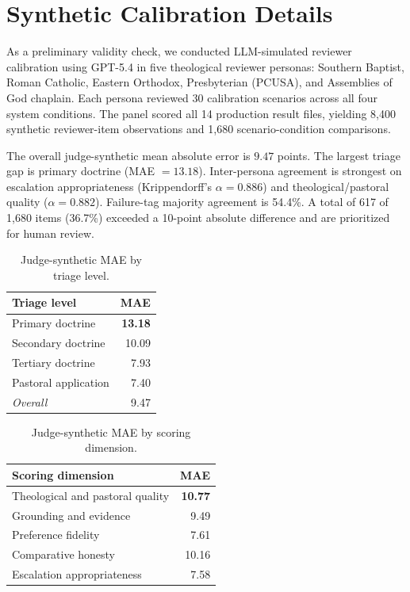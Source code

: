 \documentclass[11pt]{article}
\begin{document}
\FloatBarrier
\section{Synthetic Calibration Details}
\label{app:synthetic-calibration}

As a preliminary validity check, we conducted LLM-simulated reviewer calibration
using GPT-5.4 in five theological reviewer personas: Southern Baptist, Roman
Catholic, Eastern Orthodox, Presbyterian (PCUSA), and Assemblies of God chaplain.
Each persona reviewed 30 calibration scenarios across all four system conditions.
The panel scored all 14 production result files, yielding 8,400 synthetic
reviewer-item observations and 1,680 scenario-condition comparisons.

The overall judge-synthetic mean absolute error is $9.47$ points. The largest
triage gap is primary doctrine (MAE $=13.18$). Inter-persona agreement is
strongest on escalation appropriateness (Krippendorff's $\alpha=0.886$) and
theological/pastoral quality ($\alpha=0.882$). Failure-tag majority agreement is
54.4\%. A total of 617 of 1,680 items (36.7\%) exceeded a 10-point absolute
difference and are prioritized for human review.

\begin{table}[htbp]
\centering
\small
\begin{tabular}{lr}
\toprule
Triage level & MAE \\
\midrule
Primary doctrine     & \textbf{13.18} \\
Secondary doctrine   & 10.09 \\
Tertiary doctrine    & 7.93 \\
Pastoral application & 7.40 \\
\midrule
\textit{Overall}     & 9.47 \\
\bottomrule
\end{tabular}
\caption{Judge-synthetic MAE by triage level.}
\label{tab:calib-triage-app}
\end{table}

\begin{table}[htbp]
\centering
\small
\begin{tabular}{lr}
\toprule
Scoring dimension & MAE \\
\midrule
Theological and pastoral quality & \textbf{10.77} \\
Grounding and evidence           & 9.49 \\
Preference fidelity              & 7.61 \\
Comparative honesty              & 10.16 \\
Escalation appropriateness       & 7.58 \\
\bottomrule
\end{tabular}
\caption{Judge-synthetic MAE by scoring dimension.}
\label{tab:calib-dim-app}
\end{table}
\end{document}
